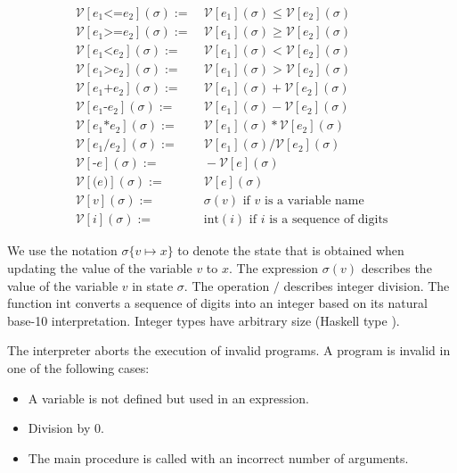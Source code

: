 \documentclass{article}
\newcommand\inParens[1]{\texttt{(}#1\texttt{)}}
\begin{document}
\begin{align}
\mathcal{V}[e_1 \texttt{<=} e_2](\sigma) :=& \ \mathcal{V}[e_1](\sigma) \le \mathcal{V}[e_2](\sigma) \\
\mathcal{V}[e_1 \texttt{>=} e_2](\sigma) :=& \ \mathcal{V}[e_1](\sigma) \ge \mathcal{V}[e_2](\sigma) \\
\mathcal{V}[e_1 \texttt{<} e_2](\sigma) :=& \ \mathcal{V}[e_1](\sigma) < \mathcal{V}[e_2](\sigma) \\
\mathcal{V}[e_1 \texttt{>} e_2](\sigma) :=& \ \mathcal{V}[e_1](\sigma) > \mathcal{V}[e_2](\sigma) \\
\mathcal{V}[e_1 \texttt{+} e_2](\sigma) :=& \ \mathcal{V}[e_1](\sigma) + \mathcal{V}[e_2](\sigma) \\
\mathcal{V}[e_1 \texttt{-} e_2](\sigma) :=& \ \mathcal{V}[e_1](\sigma) - \mathcal{V}[e_2](\sigma) \\
\mathcal{V}[e_1 \texttt{*} e_2](\sigma) :=& \ \mathcal{V}[e_1](\sigma) * \mathcal{V}[e_2](\sigma) \\
\mathcal{V}[e_1 \texttt{/} e_2](\sigma) :=& \ \mathcal{V}[e_1](\sigma) / \mathcal{V}[e_2](\sigma) \\
\mathcal{V}[\texttt{-}e](\sigma) :=& \ -\mathcal{V}[e](\sigma) \\
\mathcal{V}[\inParens{e}](\sigma) :=& \ \mathcal{V}[e](\sigma) \\
\mathcal{V}[v](\sigma) :=& \ \sigma(v) \mbox{ if } v \mbox { is a variable name}\\
\mathcal{V}[i](\sigma) :=& \ \mbox{int}(i) \mbox{ if } i \mbox { is a sequence of digits}
\end{align}


We use the notation $\sigma\{v \mapsto x\}$ to denote the state that is obtained when updating the value of the variable $v$ to $x$. The expression $\sigma(v)$ describes the value of the variable $v$ in state $\sigma$. The operation $/$ describes integer division. The function $\mbox{int}$ converts a sequence of digits into an integer based on its natural base-10 interpretation. Integer types have arbitrary size (Haskell type ).

The interpreter aborts the execution of invalid programs. A program is invalid in one of the following cases:

\begin{itemize}
\item A variable is not defined but used in an expression.
\item Division by 0.
\item The main procedure is called with an incorrect number of arguments.
\end{itemize}
\end{document}
